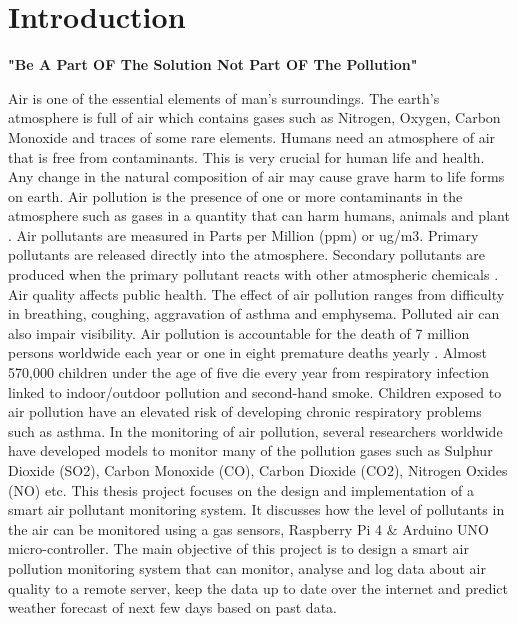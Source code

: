 \chapter{Introduction}\label{chap1}



\vspace{2in}
\begin{center}
	\textbf{\large "Be A Part OF The Solution Not Part OF The Pollution"}
\end{center}


\newpage

Air is one of the essential elements of man’s surroundings. The earth’s atmosphere is full of air which contains gases such as Nitrogen, Oxygen, Carbon Monoxide and traces of some rare elements. Humans need an atmosphere of air that is free from contaminants. This is very crucial for human life and health. Any change in the natural composition of air may cause grave harm to life forms on earth. Air pollution is the presence of one or more contaminants in the atmosphere such as gases in a quantity that can harm humans, animals and plant . Air pollutants are measured in Parts per Million (ppm) or ug/m3. Primary pollutants are released directly into the atmosphere. Secondary pollutants are produced when the primary pollutant reacts with other atmospheric chemicals . Air quality affects public health. The effect of air pollution ranges from difficulty in breathing, coughing, aggravation of asthma and emphysema. Polluted air can also impair visibility. Air pollution is accountable for the death of 7 million persons worldwide each year or one in eight premature deaths yearly . Almost 570,000 children under the age of five die every year from respiratory infection linked to indoor/outdoor pollution and second-hand smoke. Children exposed to air pollution have an elevated risk of developing chronic respiratory problems such as asthma. In the monitoring of air pollution, several researchers worldwide have developed models to monitor many of the pollution gases such as Sulphur Dioxide (SO2), Carbon Monoxide (CO), Carbon Dioxide (CO2), Nitrogen Oxides (NO) etc. This thesis project focuses on the design and implementation of a smart air pollutant monitoring system. It discusses how the level of pollutants in the air can be monitored using a gas sensors, Raspberry Pi 4 \& Arduino UNO micro-controller. The main objective of this project is to design a smart air pollution monitoring system that can monitor, analyse and log data about air quality to a remote server, keep the data up to date over the internet and predict weather forecast of next few days based on past data.



